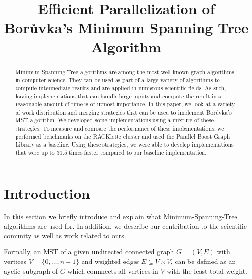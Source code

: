 \documentclass[letterpaper]{article}
\title{Efficient Parallelization of Bor\r{u}vka's \linebreak Minimum Spanning Tree Algorithm}
\begin{document}
\maketitle

\begin{abstract}
Minimum-Spanning-Tree algorithms are among the most well-known graph algorithms in computer science. They can be used as
part of a large variety of algorithms to compute intermediate results and are applied in numerous scientific fields. As
such, having implementations that can handle large inputs and compute the result in a reasonable amount of time is of
utmost importance. In this paper, we look at a variety of work distribution and merging strategies that can be used to
implement Bor\r{u}vka's MST algorithm. We developed some implementations using a mixture of these strategies. To measure
and compare the performance of these implementations, we performed benchmarks on the RACKlette cluster and used the
Parallel Boost Graph Library as a baseline. Using these strategies, we were able to develop implementations that were up
to $31.5$ times faster compared to our baseline implementation.
\end{abstract}

\section{Introduction}
\label{sec:intro}
In this section we briefly introduce and explain what Minimum-Spanning-Tree algorithms are used for. In addition, we
describe our contribution to the scientific comunity as well as work related to ours.

Formally, an MST of a given undirected connected graph $G = (V, E)$ with vertices $V = \{ 0, \dotsc, n - 1 \}$ and
weighted edges $E \subseteq V \times V$, can be defined as an ayclic subgraph of $G$ which connnects all vertices in
$V$ with the least total weight.
\end{document}
